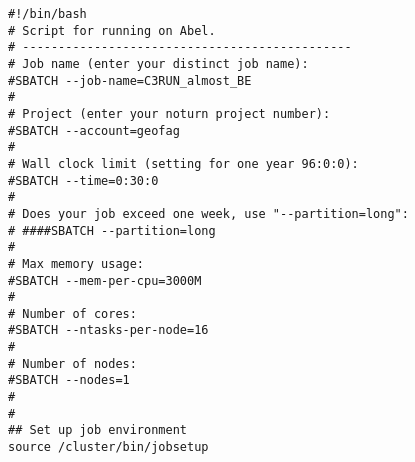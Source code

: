 \begin{lstlisting}
#!/bin/bash
# Script for running on Abel.
# ----------------------------------------------
# Job name (enter your distinct job name):
#SBATCH --job-name=C3RUN_almost_BE
#
# Project (enter your noturn project number):
#SBATCH --account=geofag
#
# Wall clock limit (setting for one year 96:0:0):
#SBATCH --time=0:30:0
#
# Does your job exceed one week, use "--partition=long":
# ####SBATCH --partition=long
#
# Max memory usage:
#SBATCH --mem-per-cpu=3000M
#
# Number of cores:
#SBATCH --ntasks-per-node=16
#
# Number of nodes:
#SBATCH --nodes=1
#
#
## Set up job environment
source /cluster/bin/jobsetup
\end{lstlisting}